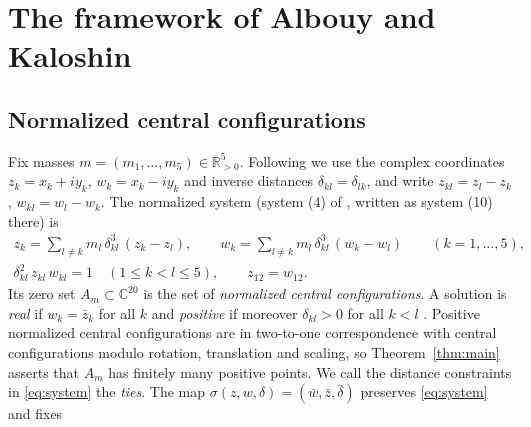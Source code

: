 \documentclass[11pt]{amsart}
\theoremstyle{definition}
\theoremstyle{remark}
\newcommand{\C}{\mathbb{C}}
\newcommand{\Rp}{\mathbb{R}_{>0}}
\begin{document}
\section{The framework of Albouy and Kaloshin}\label{sec:ak}

\subsection{Normalized central configurations}
Fix masses $m=(m_1,\dots,m_5)\in\Rp^5$.  Following \cite[\S2]{AK} we use the complex coordinates
$z_k=x_k+iy_k$, $w_k=x_k-iy_k$ and inverse distances $\delta_{kl}=\delta_{lk}$, and write
$z_{kl}=z_l-z_k$, $w_{kl}=w_l-w_k$.  The normalized system (system (4) of \cite{AK}, written as
system (10) there) is
\begin{equation}\label{eq:system}
\begin{gathered}
  z_k = \sum_{l\ne k} m_l\,\delta_{kl}^3\,(z_k-z_l),\qquad
  w_k = \sum_{l\ne k} m_l\,\delta_{kl}^3\,(w_k-w_l)\qquad (k=1,\dots,5),\\
  \delta_{kl}^2\, z_{kl}\,w_{kl} = 1\quad (1\le k<l\le 5),\qquad z_{12} = w_{12}.
\end{gathered}
\end{equation}
Its zero set $A_m\subset\C^{20}$ is the set of \emph{normalized central configurations}.  A
solution is \emph{real} if $w_k=\bar z_k$ for all $k$ and \emph{positive} if moreover
$\delta_{kl}>0$ for all $k<l$ \cite[Def.~2]{AK}.  Positive normalized central configurations are
in two-to-one correspondence with central configurations modulo rotation, translation and
scaling, so Theorem~\ref{thm:main} asserts that $A_m$ has finitely many positive points.
We call the distance constraints in \eqref{eq:system} the \emph{ties}.
The map $\sigma(z,w,\delta)=(\bar w,\bar z,\bar\delta)$ preserves \eqref{eq:system} and fixes
\end{document}
